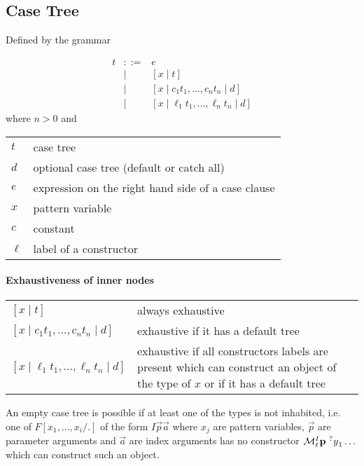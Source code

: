 \subsection{Case Tree}


Defined by the grammar

$$
    \begin{array}{lllll}
        t
        &::=& e
        \\
        &\mid& [x \mid t]
        \\
        &\mid& [x \mid c_1 t_1, \ldots,  c_n t_n \mid d]
        \\
        &\mid& [x \mid \ell_1 t_1, \ldots, \ell_n t_n \mid d]
    \end{array}
$$
%
where $n > 0$ and
%
\begin{center}
    \begin{tabular}{l p{8cm}}
        $t$ & case tree
        \\
        $d$ & optional case tree (default or catch all)
        \\
        $e$ & expression on the right hand side of a case clause
        \\
        $x$ & pattern variable
        \\
        $c$ & constant
        \\
        $\ell$ & label of a constructor
    \end{tabular}
\end{center}

\paragraph{Exhaustiveness of inner nodes}
%
\begin{center}
    \begin{tabular}{l p{6cm}}
        $[x \mid t]$ & always exhaustive
        \\
        $[x \mid c_1 t_1, \ldots, c_n t_n \mid d]$
        & exhaustive if it has a default tree
        \\
        $[x \mid \ell_1 t_1, \ldots, \ell_n t_n \mid d]$
        & exhaustive if all constructors labels are present which can construct
        an object of the type of $x$ or if it has a default tree
    \end{tabular}
\end{center}


An empty case tree is possible if at least one of the types is not inhabited,
i.e. one of $F[x_1, \ldots, x_i/.]$ of the form $I \vec p \vec a$  where $x_j$
are pattern variables, $\vec p$ are parameter arguments and $\vec a$ are index
arguments has no constructor ${\cal M}^I_\ell {\mathbf p} {\ ^?y}_1 \ldots$
which can construct such an object.







